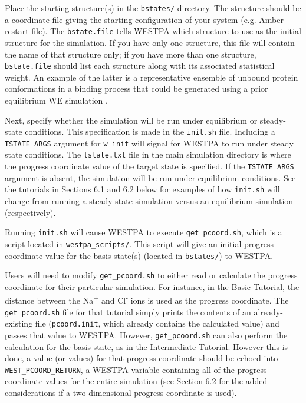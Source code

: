 \documentclass[9pt,tutorial,pubversion]{livecoms}
\begin{document}
Place the starting structure(s) in the \verb|bstates/| directory. 
The structure should be a coordinate file giving the starting configuration of your system (e.g. Amber restart file). 
The \verb|bstate.file| tells WESTPA which structure to use as the initial structure for the simulation. 
If you have only one structure, this file will contain the name of that structure only; if you have more than one structure, \verb|bstate.file| should list each structure along with its associated statistical weight. 
An example of the latter is a representative ensemble of unbound protein conformations in a binding process that could be generated using a prior equilibrium WE simulation \citep{Zwier2016,Saglam2019}. 

Next, specify whether the simulation will be run under equilibrium or steady-state conditions. 
This specification is made in the \verb|init.sh| file. 
Including a \verb|TSTATE_ARGS| argument for \verb|w_init| will signal for WESTPA to run under steady state conditions. 
The \verb|tstate.txt| file in the main simulation directory is where the progress coordinate value of the target state is specified. 
If the \verb|TSTATE_ARGS| argument is absent, the simulation will be run under equilibrium conditions. 
See the tutorials in Sections 6.1 and 6.2 below for examples of how \verb|init.sh| will change from running a steady-state simulation versus an equilibrium simulation (respectively).

Running \verb|init.sh| will cause WESTPA to execute \verb|get_pcoord.sh|, which is a script located in \verb|westpa_scripts/|. 
This script will give an initial progress-coordinate value for the basis state(s) (located in \verb|bstates/|) to WESTPA.


Users will need to modify \verb|get_pcoord.sh| to either read or calculate the progress coordinate for their particular simulation.
For instance, in the Basic Tutorial, the distance between the Na\textsuperscript{+} and Cl\textsuperscript{-} ions is used as the progress coordinate.
The \verb|get_pcoord.sh| file for that tutorial simply prints the contents of an already-existing file (\verb|pcoord.init|, which already contains the calculated value) and passes that value to WESTPA. 
However, \verb|get_pcoord.sh| can also perform the calculation for the basis state, as in the Intermediate Tutorial.
However this is done, a value (or values) for that progress coordinate should be echoed into \verb|WEST_PCOORD_RETURN|, a WESTPA variable containing all of the progress coordinate values for the entire simulation (see Section 6.2 for the added considerations if a two-dimensional progress coordinate is used).
\end{document}
